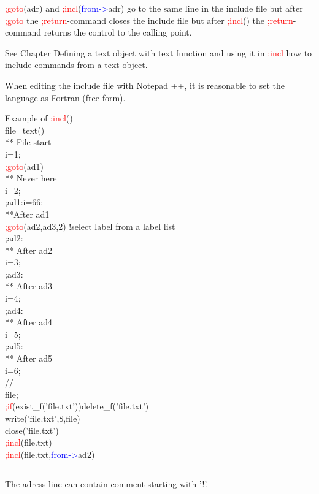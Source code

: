 \begin{note} 
\textcolor{Red}{;goto}(adr) and \textcolor{Red}{;incl}(\textcolor{blue}{from->}adr) go to the same line in the include file but after \textcolor{Red}{;goto} the \textcolor{Red}{;return}-command 
closes the include file but after \textcolor{Red}{;incl}() the \textcolor{Red}{;return}-command returns the control to the calling point. 
\end{note} 
\begin{note} 
See Chapter Defining a text object with text function and using it in \textcolor{Red}{;incl} how to include 
commands from a text object. 
\end{note} 
\begin{note} 
When editing the include file with Notepad ++, it is reasonable to set the language as Fortran (free form). 
\end{note} 
\singlespacing 
\begin{example}[inpuincl]Example of \textcolor{Red}{;incl}()\\ 
\label{inpuincl} 
\noindent file=\textcolor{VioletRed}{text}()\\ 
{\color{ForestGreen}** File start}\\ 
i=1;\\ 
\textcolor{Red}{;goto}(ad1)\\ 
{\color{ForestGreen}** Never here}\\ 
i=2;\\ 
;ad1:i=66;\\ 
{\color{ForestGreen}**After ad1}\\ 
\textcolor{Red}{;goto}(ad2,ad3,2)\,\,{\color{ForestGreen}!select label from a label list}\\ 
;ad2:\\ 
{\color{ForestGreen}** After ad2}\\ 
i=3;\\ 
;ad3:\\ 
{\color{ForestGreen}** After ad3}\\ 
i=4;\\ 
;ad4:\\ 
{\color{ForestGreen}** After ad4}\\ 
i=5;\\ 
;ad5:\\ 
{\color{ForestGreen}** After ad5}\\ 
i=6;\\ 
//  \\ 
file;\\ 
\textcolor{Red}{;if}(\textcolor{VioletRed}{exist\_f}('file.txt'))\textcolor{VioletRed}{delete\_f}('file.txt')\\ 
\textcolor{VioletRed}{write}('file.txt',\$,file)\\ 
\textcolor{VioletRed}{close}('file.txt')\\ 
\textcolor{Red}{;incl}(file.txt)\\ 
\textcolor{Red}{;incl}(file.txt,\textcolor{blue}{from->}ad2)\\ 
\end{example} 
\vspace{-7mm} \rule{5cm}{0.1pt} 
\onehalfspacing 
\begin{note} 
The adress line can contain comment starting with '!'. 
\end{note} 
